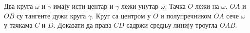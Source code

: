 \problem
Два круга $\omega$ и $\gamma$ имају исти центар и $\gamma$ лежи унутар
$\omega$.
Тачка $O$ лежи на $\omega$.
$OA$ и $OB$ су тангенте дужи круга $\gamma$.
Круг са центром у $O$ и полупречником $OA$ сече $\omega$ у тачкама $C$ и $D$.
Доказати да права $CD$ садржи средњу линију троугла $OAB$.

\solution
\endproblem
